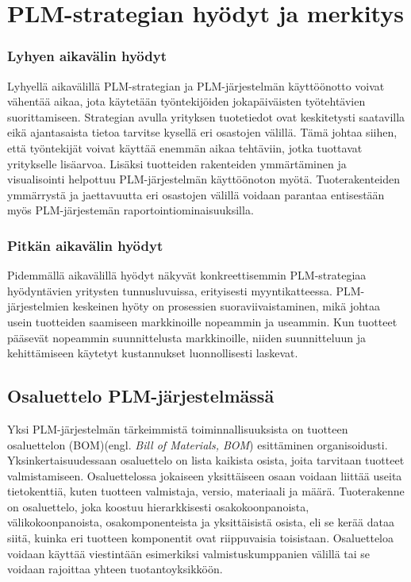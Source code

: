 \section{PLM-strategian hyödyt ja merkitys} \label{PLM-strategian hyödyt ja merkitys}


\subsubsection{Lyhyen aikavälin hyödyt} \label{Lyhyen aikavälin hyödyt}

Lyhyellä aikavälillä PLM-strategian ja PLM-järjestelmän käyttöönotto voivat vähentää aikaa, jota käytetään työntekijöiden jokapäiväisten työtehtävien suorittamiseen. Strategian avulla yrityksen tuotetiedot ovat keskitetysti saatavilla eikä ajantasaista tietoa tarvitse kysellä eri osastojen välillä. Tämä johtaa siihen, että työntekijät voivat käyttää enemmän aikaa tehtäviin, jotka tuottavat yritykselle lisäarvoa. Lisäksi tuotteiden rakenteiden ymmärtäminen ja visualisointi helpottuu PLM-järjestelmän käyttöönoton myötä. Tuoterakenteiden ymmärrystä ja jaettavuutta eri osastojen välillä voidaan parantaa entisestään myös PLM-järjestemän raportointiominaisuuksilla.  \cite{alemanni_key_2008}

\subsubsection{Pitkän aikavälin hyödyt} \label{Pitkän aikavälin hyödyt}

Pidemmällä aikavälillä hyödyt näkyvät konkreettisemmin PLM-strategiaa hyödyntävien yritysten tunnusluvuissa, erityisesti myyntikatteessa. PLM-järjestelmien keskeinen hyöty on prosessien suoraviivaistaminen, mikä johtaa usein tuotteiden saamiseen markkinoille nopeammin ja useammin. Kun tuotteet pääsevät nopeammin suunnittelusta markkinoille, niiden suunnitteluun ja kehittämiseen käytetyt kustannukset luonnollisesti laskevat.  \cite{bouhaddou_plm_2012}  \cite{alemanni_key_2008}

\subsection{Osaluettelo PLM-järjestelmässä} \label{Osaluettelo PLM-järjestelmässä}

Yksi PLM-järjestelmän tärkeimmistä toiminnallisuuksista on tuotteen osaluettelon (BOM)(engl. \textit{Bill of Materials, BOM}) esittäminen organisoidusti.\cite{david_what_2016} Yksinkertaisuudessaan osaluettelo on lista kaikista osista, joita tarvitaan tuotteet valmistamiseen. Osaluettelossa jokaiseen yksittäiseen osaan voidaan liittää useita tietokenttiä, kuten tuotteen valmistaja, versio, materiaali ja määrä. Tuoterakenne on osaluettelo, joka koostuu hierarkkisesti osakokoonpanoista, välikokoonpanoista, osakomponenteista ja yksittäisistä osista, eli se kerää dataa siitä, kuinka eri tuotteen komponentit ovat riippuvaisia toisistaan. Osaluetteloa voidaan käyttää viestintään esimerkiksi valmistuskumppanien välillä tai se voidaan rajoittaa yhteen tuotantoyksikköön.  \cite{jones_visualizing_2023}


